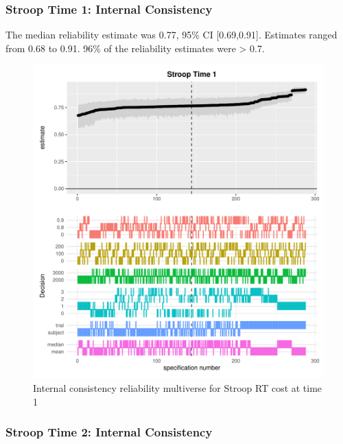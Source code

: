 \documentclass[
  english,
  man,floatsintext]{apa6}
\begin{document}
\hypertarget{stroop-time-1-internal-consistency}{%
\subsubsection{Stroop Time 1: Internal Consistency}\label{stroop-time-1-internal-consistency}}

The median reliability estimate was 0.77, 95\% CI {[}0.69,0.91{]}. Estimates ranged from 0.68 to 0.91. 96\% of the reliability estimates were \textgreater{} 0.7.

\begin{figure}
\centering
\includegraphics{Reliability_Multiverse_files/figure-latex/unnamed-chunk-5-1.pdf}
\caption{\label{fig:unnamed-chunk-5}Internal consistency reliability multiverse for Stroop RT cost at time 1}
\end{figure}

\newpage

\hypertarget{stroop-time-2-internal-consistency}{%
\subsubsection{Stroop Time 2: Internal Consistency}\label{stroop-time-2-internal-consistency}}
\end{document}
